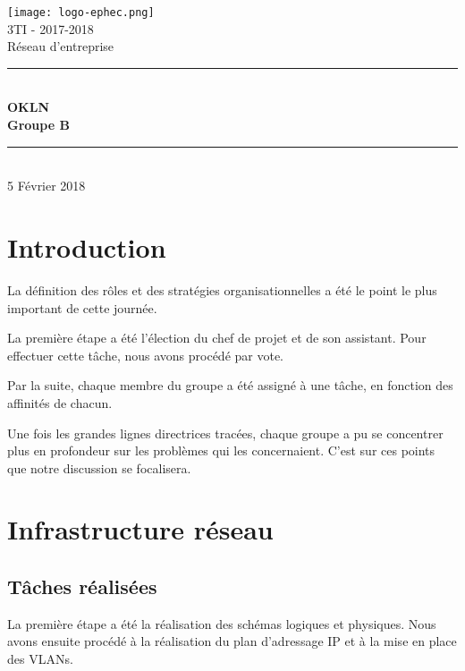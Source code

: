\documentclass{article}
\begin{document}
\begin{titlepage}
\begin{center}

\texttt{[image: logo-ephec.png]}\\[1cm]
{\large 3TI - 2017-2018}\\[0.5cm]

{\large Réseau d'entreprise}\\[0.8cm]
\newcommand{\HRule}{\rule{\linewidth}{0.5mm}}
\HRule \\[0.7cm]
{\huge \bfseries OKLN\\[0.75cm] }
{\bfseries Groupe B }\\[1cm]
\HRule \\[2.5cm]


5 Février 2018

\end{center}
\end{titlepage}


\section{Introduction}

La définition des rôles et des stratégies organisationnelles a été le point le plus important de cette journée.

La première étape a été l'élection du chef de projet et de son assistant. Pour effectuer cette tâche, nous avons procédé par vote.

Par la suite, chaque membre du groupe a été assigné à une tâche, en fonction des affinités de chacun.

Une fois les grandes lignes directrices tracées, chaque groupe a pu se concentrer plus en profondeur sur les problèmes qui les concernaient. C'est sur ces points que notre discussion se focalisera.


\section{Infrastructure réseau}
\subsection{Tâches réalisées}
La première étape a été la réalisation des schémas logiques et physiques. Nous avons ensuite procédé à la réalisation du plan d'adressage IP et à la mise en place des VLANs.
\end{document}
